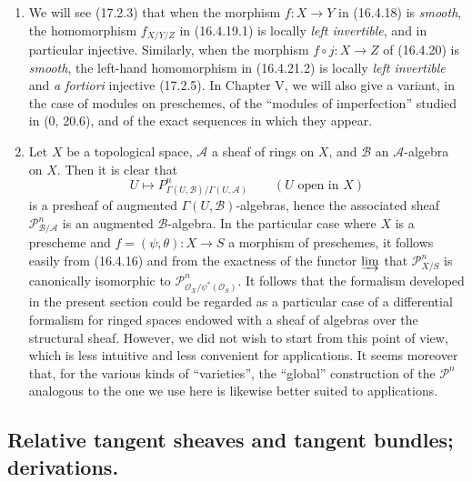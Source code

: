 \begin{remarks}[16.4.24]
\label{IV.16.4.24}
\begin{enumerate}
\item[(i)] We will see (17.2.3) that when the morphism $f:X\to Y$ in
(16.4.18) is \emph{smooth}, the homomorphism $f_{X/Y/Z}$ in (16.4.19.1) is
locally \emph{left invertible}, and in particular injective. Similarly,
when the morphism $f\circ j:X\to Z$ of (16.4.20) is \emph{smooth},
the left-hand homomorphism in (16.4.21.2) is locally
\emph{left invertible} and \emph{a fortiori} injective (17.2.5). In Chapter V,
we will also give a variant, in the case of modules on preschemes, of the
``modules of imperfection'' studied in (0, 20.6), and of the exact sequences in
which they appear.

\item[(ii)] Let $X$ be a topological space, $\mathscr{A}$ a sheaf
of rings on $X$, and $\mathscr{B}$ an $\mathscr{A}$-algebra on $X$. Then it
is clear that
\[
  U\longmapsto
  P_{\Gamma(U,\mathscr{B})/\Gamma(U,\mathscr{A})}^n
  \qquad (U\text{ open in }X)
\]
is a presheaf of augmented $\Gamma(U,\mathscr{B})$-algebras, hence the
associated sheaf $\mathscr{P}_{\mathscr{B}/\mathscr{A}}^n$ is an augmented
$\mathscr{B}$-algebra. In the particular case where $X$ is a
prescheme and $f=(\psi,\theta):X\to S$ a morphism of preschemes, it follows
easily from (16.4.16) and from the exactness of the functor $\varinjlim$ that
$\mathscr{P}_{X/S}^n$ is canonically isomorphic to
$\mathscr{P}_{\mathcal{O}_X/\psi^*(\mathcal{O}_S)}^n$. It follows that the
formalism developed in the present section could be regarded as
a
particular case of a differential formalism for ringed spaces endowed with
a sheaf of algebras over the structural sheaf. However, we did not wish
to start from this point of view, which is less intuitive and less convenient
for applications. It seems moreover that, for the various kinds of
``varieties'', the ``global'' construction of the $\mathscr{P}^n$ analogous to
the one we use here is likewise better suited to applications.
\end{enumerate}
\end{remarks}


\subsection{Relative tangent sheaves and tangent bundles; derivations.}

